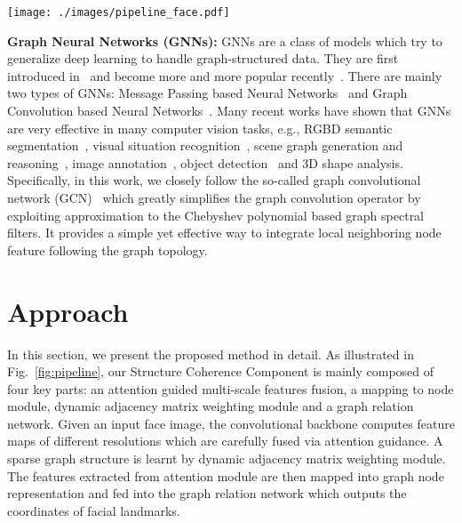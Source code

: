 \documentclass[runningheads]{llncs}
\begin{document}
\begin{figure*}[t]
	\centering
	\texttt{[image: ./images/pipeline\_face.pdf]}
	\caption{An overview of the proposed method. The convolutional backbone computes hierarchical feature maps from the input face image.
		These features are forward into our Structure Coherence Component which extracts spatial details and semantic information from different convolutional layers via attention. The map-to-node module then maps these attentive features into graph node representations. Together with the graph adjacency matrix that learned from the dataset and features extracted from map-to-node module, they are fed into the graph relation network to infer the facial landmarks.}
	\label{fig:pipeline}
\end{figure*}


\textbf{Graph Neural Networks (GNNs):}
GNNs are a class of models which try to generalize deep learning to handle graph-structured data.
They are first introduced in~\cite{graphnn} and become more and more popular recently~\cite{geometricLecun}.
There are mainly two types of GNNs:
Message Passing based Neural Networks~\cite{graphnn,li2015gated,gilmer2017neural} and
Graph Convolution based Neural Networks~\cite{bruna2013spectral,SemiGraph,liao2019lanczosnet}. 
Many recent works have shown that GNNs are very effective in many computer vision tasks, e.g., RGBD semantic segmentation~\cite{qi20173d}, visual situation recognition~\cite{li2017situation}, scene graph generation and reasoning~\cite{yang2018graph,Shi_2019_CVPR},
image annotation~\cite{Zhang_2019_CVPR}, object detection~\cite{Xu_2019_CVPR} and
3D shape analysis\cite{feastnet}.
Specifically, in this work, we closely follow the so-called graph convolutional network (GCN)~\cite{SemiGraph} which greatly simplifies the graph convolution operator by exploiting approximation to the Chebyshev polynomial based graph spectral filters.
It provides a simple yet effective way to integrate local neighboring node feature following the graph topology. 



\section{Approach}
In this section, we present the proposed method in detail.
As illustrated in Fig.~\ref{fig:pipeline}, our Structure Coherence Component is mainly composed of four key parts: an attention guided multi-scale features fusion, a mapping to node module, dynamic adjacency matrix weighting module and a graph relation network.
Given an input face image, the convolutional backbone computes feature maps of different resolutions which are carefully fused via attention guidance.
A sparse graph structure is learnt by dynamic adjacency matrix weighting module.
The features extracted from attention module are then mapped into graph node representation and fed into the graph relation network which outputs the coordinates of facial landmarks.
\end{document}
